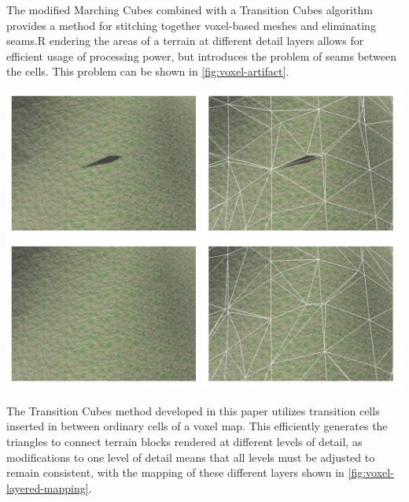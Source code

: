 \documentclass[10pt]{report}
\begin{document}
		The modified Marching Cubes combined with a Transition Cubes algorithm provides a method for stitching together voxel-based meshes and eliminating seams.R endering the areas of a terrain at different detail layers allows for efficient usage of processing power, but introduces the problem of seams between the cells. This problem can be shown in \autoref{fig:voxel-artifact}. 
		
		\begin{minipage}{\textwidth}
			\centering
			\includegraphics[scale=.75]{voxel-seam}
			\label{fig:voxel-artifact}
		\end{minipage}
		
		The Transition Cubes method developed in this paper utilizes transition cells inserted in between ordinary cells of a voxel map. This efficiently generates the triangles to connect terrain blocks rendered at different levels of detail, as modifications to one level of detail means that all levels must be adjusted to remain consistent, with the mapping of these different layers shown in \autoref{fig:voxel-layered-mapping}.
		
\end{document}
